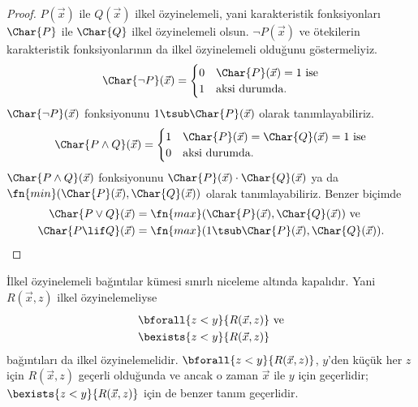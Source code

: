 \documentclass[../../../include/open-logic-section]{subfiles}
\begin{document}
\begin{proof}
  $P(\vec x)$ ile $Q(\vec x)$ ilkel özyinelemeli, yani karakteristik
  fonksiyonları $\Char{P}$ ile $\Char{Q}$ ilkel özyinelemeli olsun.
  $\lnot P(\vec x)$ ve ötekilerin karakteristik fonksiyonlarının da ilkel
  özyinelemeli olduğunu göstermeliyiz.
  \[
    \Char{\lnot P}(\vec x)=\begin{cases}
      0 & \text{$\Char{P}(\vec x)=1$ ise}\\
      1 & \text{aksi durumda.}
    \end{cases}
  \]
  $\Char{\lnot P}(\vec x)$ fonksiyonunu
  $1\tsub\Char{P}(\vec x)$ olarak tanımlayabiliriz.
  \[
    \Char{P\land Q}(\vec x)=\begin{cases}
      1 & \text{$\Char{P}(\vec x)=\Char{Q}(\vec x)=1$ ise}\\
      0 & \text{aksi durumda.}
    \end{cases}
  \]
  $\Char{P\land Q}(\vec x)$ fonksiyonunu
  $\Char{P}(\vec x)\cdot\Char{Q}(\vec x)$ ya da
  $\fn{min}(\Char{P}(\vec x),\Char{Q}(\vec x))$ olarak tanımlayabiliriz.
  Benzer biçimde
  \begin{align*}
    \Char{P\lor Q}(\vec x) & =
      \fn{max}(\Char{P}(\vec x),\Char{Q}(\vec x)) \text{ ve}\\
    \Char{P\lif Q}(\vec x) & =
      \fn{max}(1\tsub\Char{P}(\vec x),\Char{Q}(\vec x)).
  \end{align*}
\end{proof}

\begin{prop}
  İlkel özyinelemeli bağıntılar kümesi sınırlı niceleme altında kapalıdır.
  Yani $R(\vec x,z)$ ilkel özyinelemeliyse
  \begin{align*}
    & \bforall{z<y}{R(\vec x,z)} \text{ ve}\\
    & \bexists{z<y}{R(\vec x,z)}
  \end{align*}
  bağıntıları da ilkel özyinelemelidir.
  $\bforall{z<y}{R(\vec x,z)}$, $y$'den küçük her $z$ için
  $R(\vec x,z)$ geçerli olduğunda ve ancak o zaman $\vec x$ ile $y$ için
  geçerlidir; $\bexists{z<y}{R(\vec x,z)}$ için de benzer tanım geçerlidir.
\end{prop}
\end{document}
